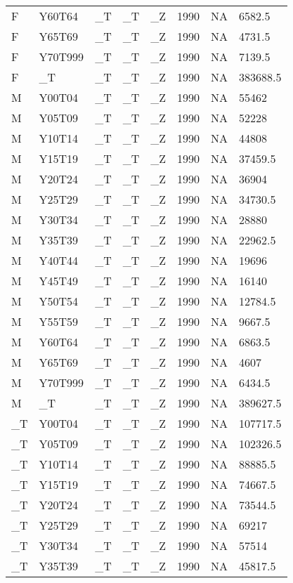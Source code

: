 \begin{longtable}[t]{llllllll}
F & Y60T64 & \_T & \_T & \_Z & 1990 & NA & 6582.5\\
F & Y65T69 & \_T & \_T & \_Z & 1990 & NA & 4731.5\\
F & Y70T999 & \_T & \_T & \_Z & 1990 & NA & 7139.5\\
\addlinespace
F & \_T & \_T & \_T & \_Z & 1990 & NA & 383688.5\\
M & Y00T04 & \_T & \_T & \_Z & 1990 & NA & 55462\\
M & Y05T09 & \_T & \_T & \_Z & 1990 & NA & 52228\\
M & Y10T14 & \_T & \_T & \_Z & 1990 & NA & 44808\\
M & Y15T19 & \_T & \_T & \_Z & 1990 & NA & 37459.5\\
\addlinespace
M & Y20T24 & \_T & \_T & \_Z & 1990 & NA & 36904\\
M & Y25T29 & \_T & \_T & \_Z & 1990 & NA & 34730.5\\
M & Y30T34 & \_T & \_T & \_Z & 1990 & NA & 28880\\
M & Y35T39 & \_T & \_T & \_Z & 1990 & NA & 22962.5\\
M & Y40T44 & \_T & \_T & \_Z & 1990 & NA & 19696\\
\addlinespace
M & Y45T49 & \_T & \_T & \_Z & 1990 & NA & 16140\\
M & Y50T54 & \_T & \_T & \_Z & 1990 & NA & 12784.5\\
M & Y55T59 & \_T & \_T & \_Z & 1990 & NA & 9667.5\\
M & Y60T64 & \_T & \_T & \_Z & 1990 & NA & 6863.5\\
M & Y65T69 & \_T & \_T & \_Z & 1990 & NA & 4607\\
\addlinespace
M & Y70T999 & \_T & \_T & \_Z & 1990 & NA & 6434.5\\
M & \_T & \_T & \_T & \_Z & 1990 & NA & 389627.5\\
\_T & Y00T04 & \_T & \_T & \_Z & 1990 & NA & 107717.5\\
\_T & Y05T09 & \_T & \_T & \_Z & 1990 & NA & 102326.5\\
\_T & Y10T14 & \_T & \_T & \_Z & 1990 & NA & 88885.5\\
\addlinespace
\_T & Y15T19 & \_T & \_T & \_Z & 1990 & NA & 74667.5\\
\_T & Y20T24 & \_T & \_T & \_Z & 1990 & NA & 73544.5\\
\_T & Y25T29 & \_T & \_T & \_Z & 1990 & NA & 69217\\
\_T & Y30T34 & \_T & \_T & \_Z & 1990 & NA & 57514\\
\_T & Y35T39 & \_T & \_T & \_Z & 1990 & NA & 45817.5\\

\end{longtable}
